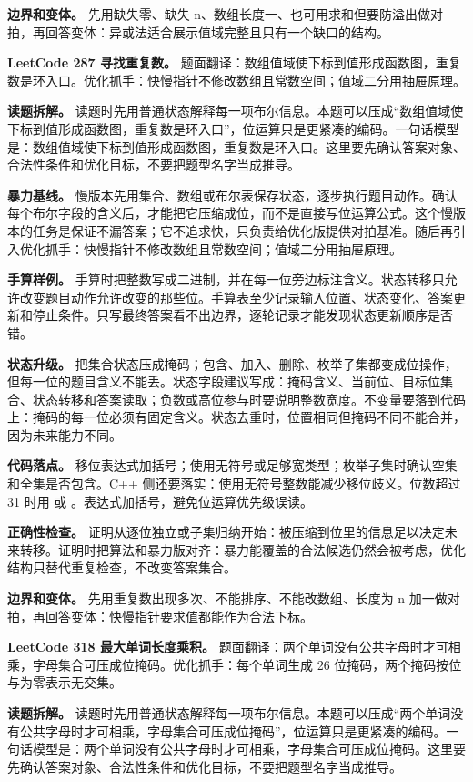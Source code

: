 \textbf{边界和变体。} 先用缺失零、缺失 n、数组长度一、也可用求和但要防溢出做对拍，再回答变体：异或法适合展示值域完整且只有一个缺口的结构。

\noindent\textbf{LeetCode 287 寻找重复数。} 题面翻译：数组值域使下标到值形成函数图，重复数是环入口。优化抓手：快慢指针不修改数组且常数空间；值域二分用抽屉原理。

\textbf{读题拆解。} 读题时先用普通状态解释每一项布尔信息。本题可以压成“数组值域使下标到值形成函数图，重复数是环入口”，位运算只是更紧凑的编码。一句话模型是：数组值域使下标到值形成函数图，重复数是环入口。这里要先确认答案对象、合法性条件和优化目标，不要把题型名字当成推导。

\textbf{暴力基线。} 慢版本先用集合、数组或布尔表保存状态，逐步执行题目动作。确认每个布尔字段的含义后，才能把它压缩成位，而不是直接写位运算公式。这个慢版本的任务是保证不漏答案；它不追求快，只负责给优化版提供对拍基准。随后再引入优化抓手：快慢指针不修改数组且常数空间；值域二分用抽屉原理。

\textbf{手算样例。} 手算时把整数写成二进制，并在每一位旁边标注含义。状态转移只允许改变题目动作允许改变的那些位。手算表至少记录输入位置、状态变化、答案更新和停止条件。只写最终答案看不出边界，逐轮记录才能发现状态更新顺序是否错。

\textbf{状态升级。} 把集合状态压成掩码；包含、加入、删除、枚举子集都变成位操作，但每一位的题目含义不能丢。状态字段建议写成：掩码含义、当前位、目标位集合、状态转移和答案读取；负数或高位参与时要说明整数宽度。不变量要落到代码上：掩码的每一位必须有固定含义。状态去重时，位置相同但掩码不同不能合并，因为未来能力不同。

\textbf{代码落点。} 移位表达式加括号；使用无符号或足够宽类型；枚举子集时确认空集和全集是否包含。C++ 侧还要落实：使用无符号整数能减少移位歧义。位数超过 31 时用  或 。表达式加括号，避免位运算优先级误读。

\textbf{正确性检查。} 证明从逐位独立或子集归纳开始：被压缩到位里的信息足以决定未来转移。证明时把算法和暴力版对齐：暴力能覆盖的合法候选仍然会被考虑，优化结构只替代重复检查，不改变答案集合。

\textbf{边界和变体。} 先用重复数出现多次、不能排序、不能改数组、长度为 n 加一做对拍，再回答变体：快慢指针要求值都能作为合法下标。

\noindent\textbf{LeetCode 318 最大单词长度乘积。} 题面翻译：两个单词没有公共字母时才可相乘，字母集合可压成位掩码。优化抓手：每个单词生成 26 位掩码，两个掩码按位与为零表示无交集。

\textbf{读题拆解。} 读题时先用普通状态解释每一项布尔信息。本题可以压成“两个单词没有公共字母时才可相乘，字母集合可压成位掩码”，位运算只是更紧凑的编码。一句话模型是：两个单词没有公共字母时才可相乘，字母集合可压成位掩码。这里要先确认答案对象、合法性条件和优化目标，不要把题型名字当成推导。

